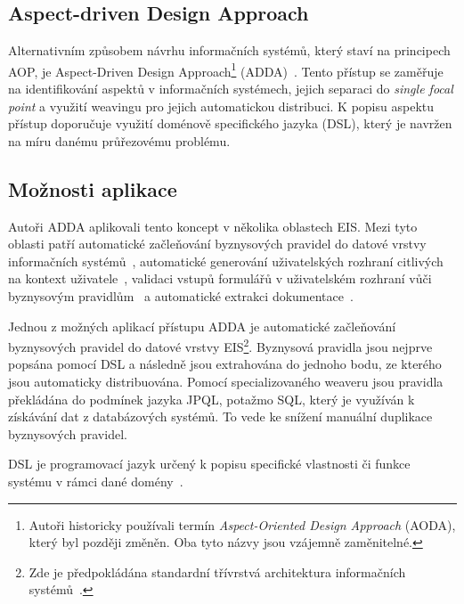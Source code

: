 \subsection{Aspect-driven Design Approach}\label{sec:adda}

Alternativním způsobem návrhu informačních systémů, který staví na principech \gls{AOP},
je Aspect-Driven Design Approach\footnote{Autoři historicky používali termín \textit{Aspect-Oriented
Design Approach} (AODA), který byl později změněn. Oba tyto názvy jsou vzájemně zaměnitelné.}
(\gls{ADDA})~\cite{cemus2014aspect}. Tento přístup se zaměřuje na identifikování aspektů v informačních systémech,
jejich separaci do \textit{single focal point} a využití weavingu pro jejich automatickou distribuci.
K popisu aspektu přístup doporučuje využití doménově specifického jazyka (\gls{DSL}), který je navržen na
míru danému průřezovému problému.

\subsection{Možnosti aplikace}

Autoři \gls{ADDA} aplikovali tento koncept v několika oblastech \gls{EIS}.
Mezi tyto oblasti patří automatické začleňování byznysových pravidel
do datové vrstvy informačních systémů~\cite{cemus2015automated}, automatické
generování uživatelských rozhraní citlivých na kontext uživatele~\cite{cemus2017separation},
validaci vstupů formulářů v uživatelském rozhraní vůči byznysovým pravidlům~\cite{cemus2016context, cemus2017separation}
a automatické extrakci dokumentace~\cite{cemus2017automated}.

Jednou z možných aplikací přístupu \gls{ADDA} je automatické začleňování
byznysových pravidel do datové vrstvy \gls{EIS}\footnote{Zde je předpokládána standardní
třívrstvá architektura informačních systémů~\cite{fowler2002patterns}.}.
Byznysová pravidla jsou nejprve popsána pomocí \gls{DSL} a následně jsou
extrahována do jednoho bodu, ze kterého jsou automaticky distribuována.
Pomocí specializovaného weaveru jsou pravidla překládána do podmínek
jazyka \gls{JPQL}, potažmo \gls{SQL}, který je využíván k získávání dat
z databázových systémů. To vede ke snížení manuální duplikace byznysových
pravidel.

\begin{definition}
    \gls{DSL} je programovací jazyk určený k popisu specifické vlastnosti či funkce systému v
    rámci dané domény~\cite{fowler2010domain}.
\end{definition}

